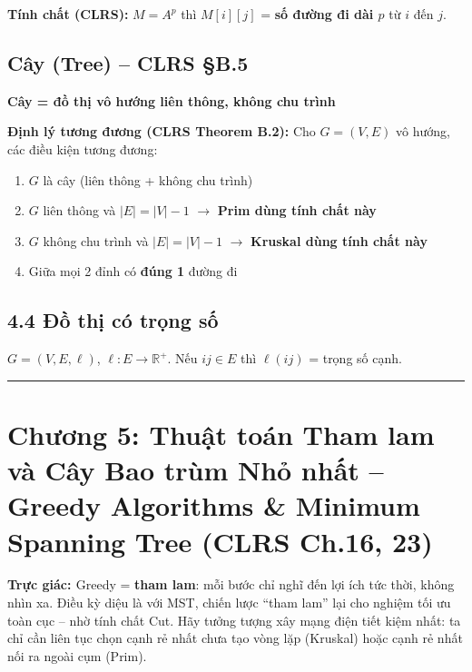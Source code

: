 \documentclass[10pt]{article}
\newcommand{\intuition}[1]{%
  \begin{tcolorbox}[colback=blue!5!white, colframe=blue!60!white, leftrule=3pt,
    toprule=0pt, bottomrule=0pt, rightrule=0pt,
    boxsep=2pt, left=6pt, right=6pt, top=4pt, bottom=4pt]
  \small\textbf{\textcolor{blue!80!black}{Trực giác: }}#1
  \end{tcolorbox}}
\providecommand{\tightlist}{\setlength{\itemsep}{0pt}\setlength{\parskip}{0pt}}
\begin{document}
\textbf{Tính chất (CLRS):} \(M = A^p\) thì \(M[i][j]\) = \textbf{số
đường đi dài \(p\)} từ \(i\) đến \(j\).

\subsection{\texorpdfstring{Cây (Tree) -- CLRS
\S B.5}{Cây (Tree) -- CLRS B.5}}\label{cuxe2y-tree-clrs-b.5}

\textbf{Cây = đồ thị vô hướng liên thông, không chu trình}

\textbf{Định lý tương đương (CLRS Theorem B.2):} Cho \(G = (V, E)\) vô
hướng, các điều kiện tương đương:

\begin{enumerate}
\def\labelenumi{\arabic{enumi}.}
\tightlist
\item
  \(G\) là cây (liên thông + không chu trình)
\item
  \(G\) liên thông và \(|E| = |V| - 1\) \(\to\) \textbf{Prim dùng tính
  chất này}
\item
  \(G\) không chu trình và \(|E| = |V| - 1\) \(\to\) \textbf{Kruskal
  dùng tính chất này}
\item
  Giữa mọi 2 đỉnh có \textbf{đúng 1} đường đi
\end{enumerate}

\subsection{4.4 Đồ thị có trọng
số}\label{ux111ux1ed3-thux1ecb-cuxf3-trux1ecdng-sux1ed1}

\(G = (V, E, \ell)\), \(\ell: E \to \mathbb{R}^+\). Nếu \(ij \in E\) thì
\(\ell(ij)\) = trọng số cạnh.

\begin{center}\rule{0.5\linewidth}{0.5pt}\end{center}

\section{Chương 5: Thuật toán Tham lam và Cây Bao trùm Nhỏ nhất -- Greedy Algorithms \& Minimum Spanning Tree (CLRS Ch.16, 23)}\label{chux1b0ux1a1ng-5-greedy-mst-clrs-ch.16-23}

\intuition{Greedy = \textbf{tham lam}: mỗi bước chỉ nghĩ đến lợi ích tức thời, không nhìn xa. Điều kỳ diệu là với MST, chiến lược ``tham lam'' lại cho nghiệm tối ưu toàn cục -- nhờ tính chất Cut. Hãy tưởng tượng xây mạng điện tiết kiệm nhất: ta chỉ cần liên tục chọn cạnh rẻ nhất chưa tạo vòng lặp (Kruskal) hoặc cạnh rẻ nhất nối ra ngoài cụm (Prim).}
\end{document}
